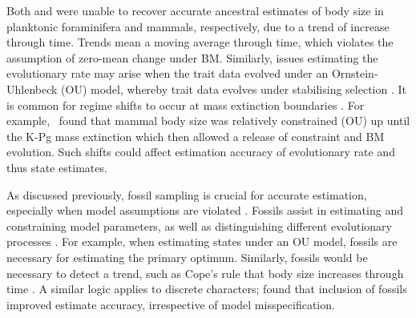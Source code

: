 \documentclass[titlepage]{article}
\begin{document}
Both \cite{webster2002testing} and \cite{finarelli2006ancestral} were unable to recover accurate ancestral estimates of body size in planktonic foraminifera and mammals, respectively, due to a trend of increase through time.
Trends mean a moving average through time, which violates the assumption of zero-mean change under BM.
Similarly, issues estimating the evolutionary rate may arise when the trait data evolved under an Ornstein-Uhlenbeck (OU) model, whereby trait data evolves under stabilising selection \citep{royer2016comparison}.
It is common for regime shifts to occur at mass extinction boundaries \citep{jablonski1986background}.
For example,~\cite{slater_phylogenetic_2013} found that mammal body size was relatively constrained (OU) up until the K-Pg mass extinction which then allowed a release of constraint and BM evolution.
Such shifts could affect estimation accuracy of evolutionary rate and thus state estimates.

As discussed previously, fossil sampling is crucial for accurate estimation, especially when model assumptions are violated \citep{puttick2016partially}.
Fossils assist in estimating and constraining model parameters, as well as distinguishing different evolutionary processes \citep{goswami2025phenomics}. 
For example, when estimating states under an OU model, fossils are necessary for estimating the primary optimum.
Similarly, fossils would be necessary to detect a trend, such as Cope's rule that body size increases through time \citep{alroy1998cope}.
A similar logic applies to discrete characters; \cite{keating2023best} found that inclusion of fossils improved estimate accuracy, irrespective of model misspecification.
\end{document}
